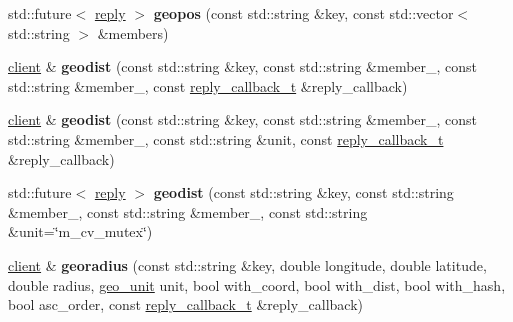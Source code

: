 \begin{DoxyCompactItemize}
\item 
\mbox{\label{classcpp__redis_1_1client_a8166870c7f3b6c5152eb85a233d78368}} 
std\+::future$<$ \mbox{\hyperlink{classcpp__redis_1_1reply}{reply}} $>$ {\bfseries geopos} (const std\+::string \&key, const std\+::vector$<$ std\+::string $>$ \&members)
\item 
\mbox{\label{classcpp__redis_1_1client_a56df27bbe73c7738854150359ba39958}} 
\mbox{\hyperlink{classcpp__redis_1_1client}{client}} \& {\bfseries geodist} (const std\+::string \&key, const std\+::string \&member\+\_, const std\+::string \&member\+\_, const \mbox{\hyperlink{classcpp__redis_1_1client_af7a65eb21aa25230bfbb0b0203c4fc04}{reply\+\_\+callback\+\_\+t}} \&reply\+\_\+callback)
\item 
\mbox{\label{classcpp__redis_1_1client_ade755123f2de81995df6a66a363a0dfb}} 
\mbox{\hyperlink{classcpp__redis_1_1client}{client}} \& {\bfseries geodist} (const std\+::string \&key, const std\+::string \&member\+\_, const std\+::string \&member\+\_, const std\+::string \&unit, const \mbox{\hyperlink{classcpp__redis_1_1client_af7a65eb21aa25230bfbb0b0203c4fc04}{reply\+\_\+callback\+\_\+t}} \&reply\+\_\+callback)
\item 
\mbox{\label{classcpp__redis_1_1client_a32c21dc5c2b8187c33e22e695c2f1555}} 
std\+::future$<$ \mbox{\hyperlink{classcpp__redis_1_1reply}{reply}} $>$ {\bfseries geodist} (const std\+::string \&key, const std\+::string \&member\+\_, const std\+::string \&member\+\_, const std\+::string \&unit=\char`\"{}m_cv_mutex\char`\"{})
\item 
\mbox{\label{classcpp__redis_1_1client_a34a5bcb40fc9d094f540ca85adc9b6c2}} 
\mbox{\hyperlink{classcpp__redis_1_1client}{client}} \& {\bfseries georadius} (const std\+::string \&key, double longitude, double latitude, double radius, \mbox{\hyperlink{classcpp__redis_1_1client_aa5998536fd32ff4387c89be514997620}{geo\+\_\+unit}} unit, bool with\+\_\+coord, bool with\+\_\+dist, bool with\+\_\+hash, bool asc\+\_\+order, const \mbox{\hyperlink{classcpp__redis_1_1client_af7a65eb21aa25230bfbb0b0203c4fc04}{reply\+\_\+callback\+\_\+t}} \&reply\+\_\+callback)
\item 
\mbox{\label{classcpp__redis_1_1client_a4e2dc000f6f89c08119500b4764f3db6}} 

\end{DoxyCompactItemize}
